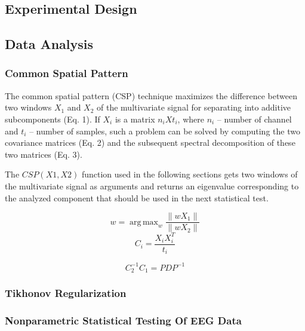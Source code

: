 \documentclass[14pt,a4paper]{scrartcl}
\DeclareMathOperator*{\argmax}{arg\,max}
\begin{document}
\subsection{Experimental Design}
\label{sec:Methods:Experimental Design}

\subsection{Data Analysis}
\label{sec:Methods:Data Analysis}

\subsubsection{Common Spatial Pattern}
\label{sec:Methods:Data Analysis:Common Spatial Pattern}

The common spatial pattern (CSP) technique maximizes the difference between two windows $X_{1}$ and $X_{2}$ of the multivariate signal for separating into additive subcomponents (Eq. 1). If $X_{i}$ is a matrix $n_{i} X t_{i}$, where $n_{i}$ – number of channel and $t_{i}$ – number of samples, such a problem can be solved by computing the two covariance matrices (Eq. 2) and the subsequent spectral decomposition of these two matrices (Eq. 3).

The $CSP(X1, X2)$ function used in the following sections gets two windows of the multivariate signal as arguments and returns an eigenvalue corresponding to the analyzed component that should be used in the next statistical test.

\begin{equation}
w = \argmax_{w}{\frac{\left \| wX_{1} \right \|}{\left \| wX_{2} \right \|}}
\end{equation}
\begin{equation}
C_{i} = \frac{X_{i}X^{T}_{i}}{t_{i}}
\end{equation}

\begin{equation}
C^{-1}_{2}C_{1} = PDP^{-1}
\end{equation}


\subsubsection{Tikhonov Regularization}
\label{sec:Methods:Data Analysis:Tikhonov Regularization}

\subsubsection{Nonparametric Statistical Testing Of EEG Data}
\label{sec:Methods:Data Analysis:Nonparametric Statistical Testing Of EEG Data}
\end{document}
